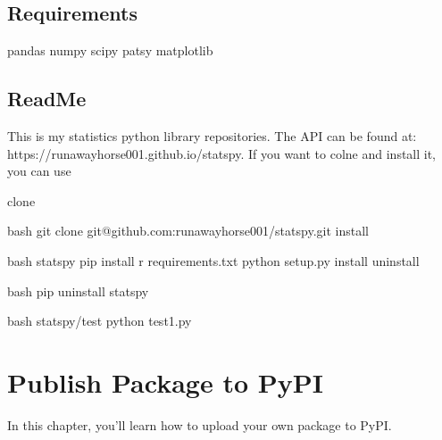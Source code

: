 \documentclass[letterpaper,12pt,english]{sphinxmanual}
\begin{document}
\section{Requirements}
\label{\detokenize{pack:requirements}}
\begin{sphinxVerbatim}[commandchars=\\\{\}]
pandas
numpy
scipy
patsy
matplotlib
\end{sphinxVerbatim}


\section{ReadMe}
\label{\detokenize{pack:readme}}
\begin{sphinxVerbatim}[commandchars=\\\{\}]

This is my statistics python library repositories.
The API can be found at: https://runawayhorse001.github.io/statspy.
If you want to colne and install it, you can use

\PYGZhy{} clone

bash
git clone git@github.com:runawayhorse001/statspy.git
\PYGZhy{} install

bash
 statspy
pip install \PYGZhy{}r requirements.txt
python setup.py install
\PYGZhy{} uninstall

bash
pip uninstall statspy

\PYGZhy{} 

bash
 statspy/test
python test1.py
\end{sphinxVerbatim}


\chapter{Publish Package to PyPI}
\label{\detokenize{pypi:publish-package-to-pypi}}\label{\detokenize{pypi:pypi}}\label{\detokenize{pypi::doc}}
\sphinxAtStartPar
In this chapter, you’ll learn how to upload your own package to PyPI.
\end{document}
